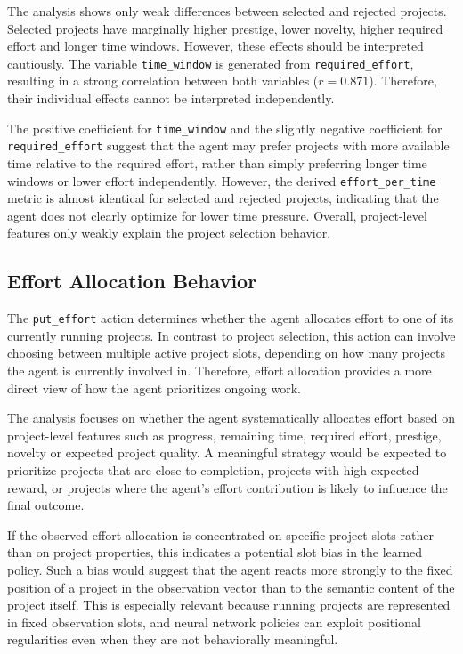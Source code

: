 \documentclass[english,bachelor]{hsluthesis}
\begin{document}
The analysis shows only weak differences between selected and rejected projects. Selected projects have marginally higher prestige, lower novelty, higher required effort and longer time windows. However, these effects should be interpreted cautiously. The variable \texttt{time\_window} is generated from \texttt{required\_effort}, resulting in a strong correlation between both variables ($r = 0.871$). Therefore, their individual effects cannot be interpreted independently.

The positive coefficient for \texttt{time\_window} and the slightly negative coefficient for \texttt{required\_effort} suggest that the agent may prefer projects with more available time relative to the required effort, rather than simply preferring longer time windows or lower effort independently. However, the derived \texttt{effort\_per\_time} metric is almost identical for selected and rejected projects, indicating that the agent does not clearly optimize for lower time pressure. Overall, project-level features only weakly explain the project selection behavior.

\subsection{Effort Allocation Behavior}

The \texttt{put\_effort} action determines whether the agent allocates effort to one of its currently running projects. In contrast to project selection, this action can involve choosing between multiple active project slots, depending on how many projects the agent is currently involved in. Therefore, effort allocation provides a more direct view of how the agent prioritizes ongoing work.

The analysis focuses on whether the agent systematically allocates effort based on project-level features such as progress, remaining time, required effort, prestige, novelty or expected project quality. A meaningful strategy would be expected to prioritize projects that are close to completion, projects with high expected reward, or projects where the agent's effort contribution is likely to influence the final outcome.

If the observed effort allocation is concentrated on specific project slots rather than on project properties, this indicates a potential slot bias in the learned policy. Such a bias would suggest that the agent reacts more strongly to the fixed position of a project in the observation vector than to the semantic content of the project itself. This is especially relevant because running projects are represented in fixed observation slots, and neural network policies can exploit positional regularities even when they are not behaviorally meaningful.
\end{document}
